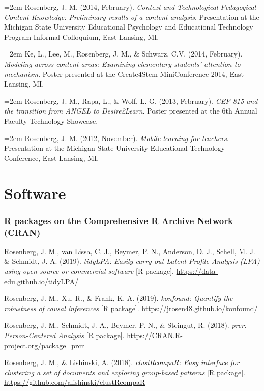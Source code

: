 \documentclass[
  11pt,
]{article}
\begin{document}
\hangindent=2em Rosenberg, J. M. (2014, February). \emph{Context and
Technological Pedagogical Content Knowledge: Preliminary results of a
content analysis}. Presentation at the Michigan State University
Educational Psychology and Educational Technology Program Informal
Colloquium, East Lansing, MI.

\hangindent=2em Ke, L., Lee, M., Rosenberg, J. M., \& Schwarz, C.V.
(2014, February). \emph{Modeling across content areas: Examining
elementary students' attention to mechanism}. Poster presented at the
Create4Stem MiniConference 2014, East Lansing, MI.

\hangindent=2em Rosenberg, J. M., Rapa, L., \& Wolf, L. G. (2013,
February). \emph{CEP 815 and the transition from ANGEL to Desire2Learn}.
Poster presented at the 6th Annual Faculty Technology Showcase.

\hangindent=2em Rosenberg, J. M. (2012, November). \emph{Mobile learning
for teachers}. Presentation at the Michigan State University Educational
Technology Conference, East Lansing, MI.

\hypertarget{software}{%
\section{Software}\label{software}}

\hypertarget{r-packages-on-the-comprehensive-r-archive-network-cran}{%
\subsubsection{R packages on the Comprehensive R Archive Network
(CRAN)}\label{r-packages-on-the-comprehensive-r-archive-network-cran}}

Rosenberg, J. M., van Lissa, C. J., Beymer, P. N., Anderson, D. J.,
Schell, M. J. \& Schmidt, J. A. (2019). \emph{tidyLPA: Easily carry out
Latent Profile Analysis (LPA) using open-source or commercial software}
{[}R package{]}. \url{https://data-edu.github.io/tidyLPA/}

Rosenberg, J. M., Xu, R., \& Frank, K. A. (2019). \emph{konfound:
Quantify the robustness of causal inferences} {[}R package{]}.
\url{https://jrosen48.github.io/konfound/}

Rosenberg, J. M., Schmidt, J. A., Beymer, P. N., \& Steingut, R. (2018).
\emph{prcr: Person-Centered Analysis} {[}R package{]}.
\url{https://CRAN.R-project.org/package=prcr}

Rosenberg, J. M., \& Lishinski, A. (2018). \emph{clustRcompaR: Easy
interface for clustering a set of documents and exploring group-based
patterns} {[}R package{]}.
\url{https://github.com/alishinski/clustRcompaR}
\end{document}

